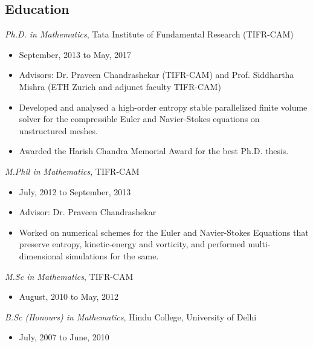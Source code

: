 \documentclass[margin]{res}
\begin{document}
\begin{resume}
\section{Education}
{\it Ph.D. in Mathematics}, Tata Institute of Fundamental Research (TIFR-CAM)
 \begin{itemize} \itemsep -2pt  %
 \item September, 2013 to May, 2017
 \item Advisors: Dr. Praveen Chandrashekar (TIFR-CAM) and Prof. Siddhartha Mishra (ETH Zurich and adjunct faculty TIFR-CAM)
  \item Developed and analysed a high-order entropy stable parallelized finite volume solver for the compressible Euler and Navier-Stokes equations on unstructured meshes. 
  \item Awarded the Harish Chandra Memorial Award for the best Ph.D. thesis.
      
 \end{itemize}

 {\it M.Phil in Mathematics}, TIFR-CAM
 \begin{itemize} \itemsep -2pt  %
 \item July, 2012 to September, 2013
 \item Advisor: Dr. Praveen Chandrashekar
 \item Worked on numerical schemes for the Euler and Navier-Stokes Equations that preserve entropy, kinetic-energy and vorticity, and performed multi-dimensional simulations for the same.
 \end{itemize}

 {\it M.Sc in Mathematics}, TIFR-CAM
 \begin{itemize} \itemsep -2pt  %
 \item August, 2010 to May, 2012
 \end{itemize}
 
 {\it B.Sc (Honours) in Mathematics}, Hindu College, University of Delhi
 \begin{itemize} \itemsep -2pt  %
 \item July, 2007 to June, 2010
 \end{itemize}
 
% 


\end{resume}
\end{document}
